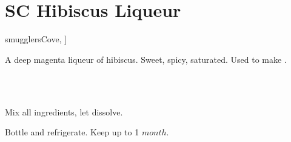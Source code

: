 \section{SC Hibiscus Liqueur}\label{hibiscus_liqueur}

\begin{recipestats}[
        servings=16~\fluidounce,
        preptime=5~\minute,
        original=\citeauthor{smugglersCove}~\cite[p.~331]{smugglersCove},
    ]
\end{recipestats}

\begin{recipeabstract}
    A deep magenta liqueur of hibiscus.
    Sweet, spicy, saturated.
    Used to make .  %
\end{recipeabstract}

\begin{ingredientcolumns}[1]
    \begin{ingredientblock}
        \\
        \\
    \end{ingredientblock}
\end{ingredientcolumns}

\begin{preparation}
\item Mix all ingredients, let dissolve.
\item Bottle and refrigerate. Keep up to 1 $month$.
\end{preparation}

\recipeend%
